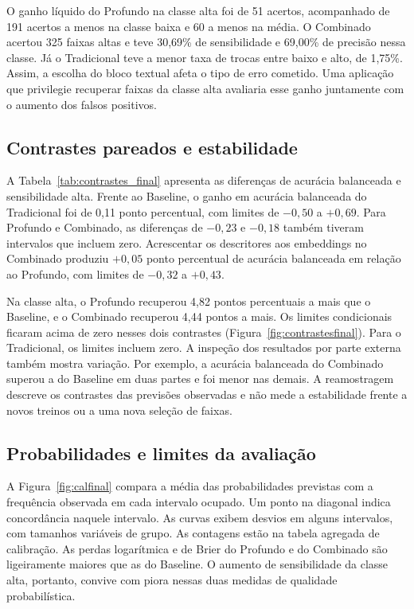 

O ganho líquido do Profundo na classe alta foi de 51 acertos, acompanhado de 191 acertos a menos na classe baixa e 60 a menos na média. O Combinado acertou 325 faixas altas e teve 30,69\% de sensibilidade e 69,00\% de precisão nessa classe. Já o Tradicional teve a menor taxa de trocas entre baixo e alto, de 1,75\%. Assim, a escolha do bloco textual afeta o tipo de erro cometido. Uma aplicação que privilegie recuperar faixas da classe alta avaliaria esse ganho juntamente com o aumento dos falsos positivos.

\subsection{Contrastes pareados e estabilidade}
A Tabela~\ref{tab:contrastes_final} apresenta as diferenças de acurácia balanceada e sensibilidade alta. Frente ao Baseline, o ganho em acurácia balanceada do Tradicional foi de 0,11 ponto percentual, com limites de $-0{,}50$ a $+0{,}69$. Para Profundo e Combinado, as diferenças de $-0{,}23$ e $-0{,}18$ também tiveram intervalos que incluem zero. Acrescentar os descritores aos embeddings no Combinado produziu $+0{,}05$ ponto percentual de acurácia balanceada em relação ao Profundo, com limites de $-0{,}32$ a $+0{,}43$.



Na classe alta, o Profundo recuperou 4,82 pontos percentuais a mais que o Baseline, e o Combinado recuperou 4,44 pontos a mais. Os limites condicionais ficaram acima de zero nesses dois contrastes (Figura~\ref{fig:contrastesfinal}). Para o Tradicional, os limites incluem zero. A inspeção dos resultados por parte externa também mostra variação. Por exemplo, a acurácia balanceada do Combinado superou a do Baseline em duas partes e foi menor nas demais. A reamostragem descreve os contrastes das previsões observadas e não mede a estabilidade frente a novos treinos ou a uma nova seleção de faixas.


\subsection{Probabilidades e limites da avaliação}
A Figura~\ref{fig:calfinal} compara a média das probabilidades previstas com a frequência observada em cada intervalo ocupado. Um ponto na diagonal indica concordância naquele intervalo. As curvas exibem desvios em alguns intervalos, com tamanhos variáveis de grupo. As contagens estão na tabela agregada de calibração. As perdas logarítmica e de Brier do Profundo e do Combinado são ligeiramente maiores que as do Baseline. O aumento de sensibilidade da classe alta, portanto, convive com piora nessas duas medidas de qualidade probabilística.

